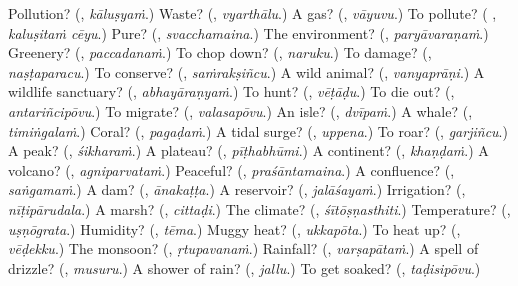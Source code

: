 \begin{tcolorbox}[breakable,colback=teal!4,colframe=teal!35!black,title={Before you move on}]
Pollution? (\textbf{}, \emph{kāluṣyaṁ}.) Waste? (\textbf{}, \emph{vyarthālu}.) A gas? (\textbf{}, \emph{vāyuvu}.) To pollute? (\textbf{ }, \emph{kaluṣitaṁ cēyu}.) Pure? (\textbf{}, \emph{svacchamaina}.) The environment? (\textbf{}, \emph{paryāvaraṇaṁ}.) Greenery? (\textbf{}, \emph{paccadanaṁ}.) To chop down? (\textbf{}, \emph{naruku}.) To damage? (\textbf{}, \emph{naṣṭaparacu}.) To conserve? (\textbf{}, \emph{saṁrakṣiñcu}.) A wild animal? (\textbf{}, \emph{vanyaprāṇi}.) A wildlife sanctuary? (\textbf{}, \emph{abhayāraṇyaṁ}.) To hunt? (\textbf{}, \emph{vēṭāḍu}.) To die out? (\textbf{}, \emph{antariñcipōvu}.) To migrate? (\textbf{}, \emph{valasapōvu}.) An isle? (\textbf{}, \emph{dvīpaṁ}.) A whale? (\textbf{}, \emph{timiṅgalaṁ}.) Coral? (\textbf{}, \emph{pagaḍaṁ}.) A tidal surge? (\textbf{}, \emph{uppena}.) To roar? (\textbf{}, \emph{garjiñcu}.) A peak? (\textbf{}, \emph{śikharaṁ}.) A plateau? (\textbf{}, \emph{pīṭhabhūmi}.) A continent? (\textbf{}, \emph{khaṇḍaṁ}.) A volcano? (\textbf{}, \emph{agniparvataṁ}.) Peaceful? (\textbf{}, \emph{praśāntamaina}.) A confluence? (\textbf{}, \emph{saṅgamaṁ}.) A dam? (\textbf{}, \emph{ānakaṭṭa}.) A reservoir? (\textbf{}, \emph{jalāśayaṁ}.) Irrigation? (\textbf{}, \emph{nīṭipārudala}.) A marsh? (\textbf{}, \emph{cittaḍi}.) The climate? (\textbf{}, \emph{śītōṣṇasthiti}.) Temperature? (\textbf{}, \emph{uṣṇōgrata}.) Humidity? (\textbf{}, \emph{tēma}.) Muggy heat? (\textbf{}, \emph{ukkapōta}.) To heat up? (\textbf{}, \emph{vēḍekku}.) The monsoon? (\textbf{}, \emph{ṛtupavanaṁ}.) Rainfall? (\textbf{}, \emph{varṣapātaṁ}.) A spell of drizzle? (\textbf{}, \emph{musuru}.) A shower of rain? (\textbf{}, \emph{jallu}.) To get soaked? (\textbf{}, \emph{taḍisipōvu}.)
\end{tcolorbox}
